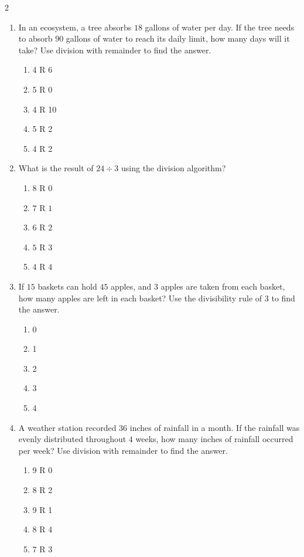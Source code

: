 \documentclass[10pt]{article}
\begin{document}
\begin{multicols}{2}
\begin{enumerate}[label=\textbf{Q\arabic*.}, leftmargin=*, itemsep=6pt, parsep=0pt]
  \item \small In an ecosystem, a tree absorbs $18$ gallons of water per day. If the tree needs to absorb $90$ gallons of water to reach its daily limit, how many days will it take? Use division with remainder to find the answer.
  \begin{enumerate}[label=(\Alph*), leftmargin=0.6cm, nosep, itemsep=2pt]
    \item 4 R 6
    \item 5 R 0
    \item 4 R 10
    \item 5 R 2
    \item 4 R 2
  \end{enumerate}

  \item \small What is the result of $24 \div 3$ using the division algorithm?
  \begin{enumerate}[label=(\Alph*), leftmargin=0.6cm, nosep, itemsep=2pt]
    \item $8$ R $0$
    \item $7$ R $1$
    \item $6$ R $2$
    \item $5$ R $3$
    \item $4$ R $4$
  \end{enumerate}

  \item \small If $15$ baskets can hold $45$ apples, and $3$ apples are taken from each basket, how many apples are left in each basket? Use the divisibility rule of $3$ to find the answer.
  \begin{enumerate}[label=(\Alph*), leftmargin=0.6cm, nosep, itemsep=2pt]
    \item 0
    \item 1
    \item 2
    \item 3
    \item 4
  \end{enumerate}

  \item \small A weather station recorded $36$ inches of rainfall in a month. If the rainfall was evenly distributed throughout $4$ weeks, how many inches of rainfall occurred per week? Use division with remainder to find the answer.
  \begin{enumerate}[label=(\Alph*), leftmargin=0.6cm, nosep, itemsep=2pt]
    \item 9 R 0
    \item 8 R 2
    \item 9 R 1
    \item 8 R 4
    \item 7 R 3
  \end{enumerate}


\end{enumerate}
\end{multicols}
\end{document}

